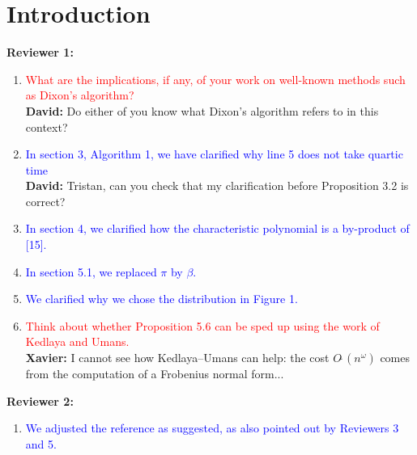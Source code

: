 \documentclass{sig-alternate-05-2015}
\newcommand{\softO}{O\tilde{~}}
\newcommand{\done}[1]{\textcolor{blue}{#1}}
\newcommand{\tdo}[1]{\textcolor{red}{#1}}
\newcommand{\xavier}[1]{\textcolor{answer}{{\bf Xavier:} #1}}
\newcommand{\david}[1]{\textcolor{answer}{{\bf David:} #1}}
\begin{document}
\vspace{-1.5mm}

%
%

\section{Introduction}
\vspace{0.1in}
\noindent \textbf{Reviewer 1:}
\begin{enumerate}
\item \tdo{What are the implications, if any, of your work on well-known methods such as Dixon's algorithm?}\\
     \david{Do either of you know what Dixon's algorithm refers to in this context?}
\item \done{In section 3, Algorithm 1, we have clarified why line 5 does not take quartic time} \\
      \david{Tristan, can you check that my clarification before Proposition 3.2 is correct?}
\item \done{In section 4, we clarified how the characteristic polynomial is a by-product of [15].}
\item \done{In section 5.1, we replaced $\pi$ by $\beta$.}
\item \done{We clarified why we chose the distribution in Figure 1.}
\item \tdo{Think about whether Proposition 5.6 can be sped up using the work of Kedlaya and Umans.}\\
      \xavier{I cannot see how Kedlaya--Umans can help: the cost $\softO(n^\omega)$ comes from the computation of a Frobenius normal form...}
\end{enumerate}
\textbf{Reviewer 2:}
\begin{enumerate}
\item \done{We adjusted the reference as suggested, as also pointed out by Reviewers 3 and 5.}
\end{enumerate}
\end{document}
